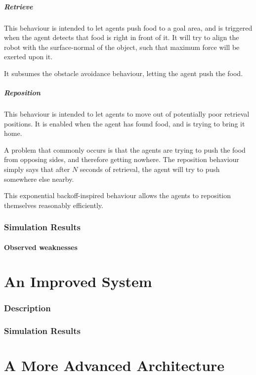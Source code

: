 \documentclass[a4paper]{article}
\begin{document}
\subsubsection{Retrieve}
This behaviour is intended to let agents push food to a goal area, and is triggered when the agent detects that food is right in front of it.
It will try to align the robot with the surface-normal of the object, such that maximum force will be exerted upon it.

It subsumes the obstacle avoidance behaviour, letting the agent push the food.

\subsubsection{Reposition}
This behaviour is intended to let agents to move out of potentially poor retrieval positions.
It is enabled when the agent has found food, and is trying to bring it home.

A problem that commonly occurs is that the agents are trying to push the food from opposing sides, and therefore getting nowhere.
The reposition behaviour simply says that after $ N $ seconds of retrieval, the agent will try to push somewhere else nearby.

This exponential backoff-inspired behaviour allows the agents to reposition themselves reasonably efficiently.

\section{Simulation Results}


\subsection{Observed weaknesses}
\part{An Improved System}

\section{Description}



\section{Simulation Results}
\part{A More Advanced Architecture}
\end{document}
